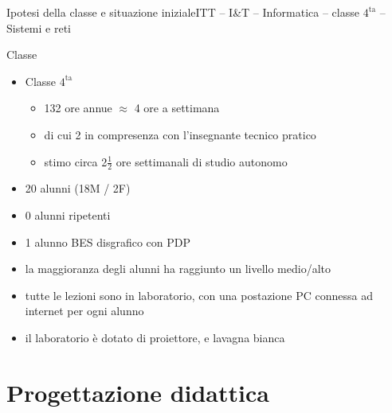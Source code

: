 \documentclass[italian]{beamer}
\begin{document}
\begin{frame}{Ipotesi della classe e situazione iniziale}{ITT -- I\&T -- Informatica -- classe $4^{\text{ta}}$ -- Sistemi e reti}
	
	\begin{block}{Classe}
		\begin{itemize}
			\item Classe $4^{\text{ta}}$
			\begin{itemize}
				\item 132 ore annue $\approx$ 4 ore a settimana
				\item di cui 2 in compresenza con l'insegnante tecnico pratico
				\item stimo circa 2$\frac{1}{2}$ ore settimanali di studio autonomo
			\end{itemize}			
			\item 20 alunni (18M / 2F)
			\item 0 alunni ripetenti
			\item 1 alunno BES disgrafico con PDP 
			\item la maggioranza degli alunni ha raggiunto un livello medio/alto
			\item tutte le lezioni sono in laboratorio, con una postazione PC connessa ad internet per ogni alunno
			\item il laboratorio \`e dotato di proiettore, e lavagna bianca
		\end{itemize}
	\end{block}
	
\end{frame}

\section[Progettazione didattica]{Progettazione didattica}
\end{document}
